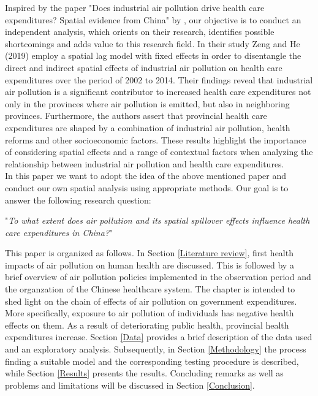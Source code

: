 \documentclass[
]{article}
\begin{document}
	Inspired by the paper "Does industrial air pollution drive health care expenditures? Spatial evidence from China" by \cite{zeng2019does}, our objective is to conduct an independent analysis, which orients on their research, identifies possible shortcomings and adds value to this research field. In their study Zeng and He (2019) employ a spatial lag model with fixed effects in order to disentangle the direct and indirect spatial effects of industrial air pollution on health care expenditures over the period of 2002 to 2014. Their findings reveal that industrial air pollution is a significant contributor to increased health care expenditures not only in the provinces where air pollution is emitted, but also in neighboring provinces. Furthermore, the authors assert that provincial health care expenditures are shaped by a combination of industrial air pollution, health reforms and other socioeconomic factors. These results highlight the importance of considering spatial effects and a range of contextual factors when analyzing the relationship between industrial air pollution and health care expenditures.\\ 

	In this paper we want to adopt the idea of the above mentioned paper and conduct our own spatial analysis using appropriate methods. Our goal is to answer the following research question:

	"\textit{To what extent does air pollution and its spatial spillover effects influence health care expenditures in China?}"

	This paper is organized as follows. In Section \ref{Literature review}, first health impacts of air pollution on human health are discussed. This is followed by a brief overview of air pollution policies implemented in the observation period and the organzation of the Chinese healthcare system. The chapter is intended to shed light on the chain of effects of air pollution on government expenditures. More specifically, exposure to air pollution of individuals has negative health effects on them. As a result of deteriorating public health, provincial health expenditures increase. 
	Section \ref{Data} provides a brief description of the data used and an exploratory analysis. 
	Subsequently, in Section \ref{Methodology} the process finding a suitable model and the corresponding testing procedure is described, while Section \ref{Results} presents the results. 
	Concluding remarks as well as problems and limitations will be discussed  in Section \ref{Conclusion}. 
\end{document}
